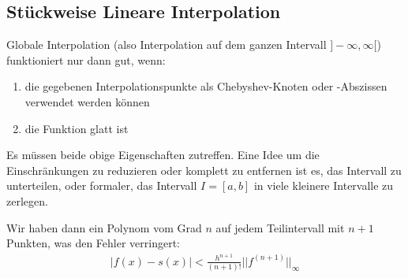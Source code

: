 
\subsection{Stückweise Lineare Interpolation}
Globale Interpolation (also Interpolation auf dem ganzen Intervall $]-\infty, \infty[$) funktioniert nur dann gut, wenn:
\rmvspace
\begin{enumerate}[label=(\alph*), noitemsep]
    \item die gegebenen Interpolationspunkte als Chebyshev-Knoten oder -Abszissen verwendet werden können
    \item die Funktion glatt ist
\end{enumerate}
Es müssen beide obige Eigenschaften zutreffen. 
Eine Idee um die Einschränkungen zu reduzieren oder komplett zu entfernen ist es, das Intervall zu unterteilen, oder formaler,
das Intervall $I = [a, b]$ in viele kleinere Intervalle zu zerlegen.

Wir haben dann ein Polynom vom Grad $n$ auf jedem Teilintervall mit $n + 1$ Punkten, was den Fehler verringert:
\begin{align*}
    |f(x) - s(x)| < \frac{h^{n + 1}}{(n + 1)!} ||f^{(n + 1)}||_{\infty}
\end{align*}

